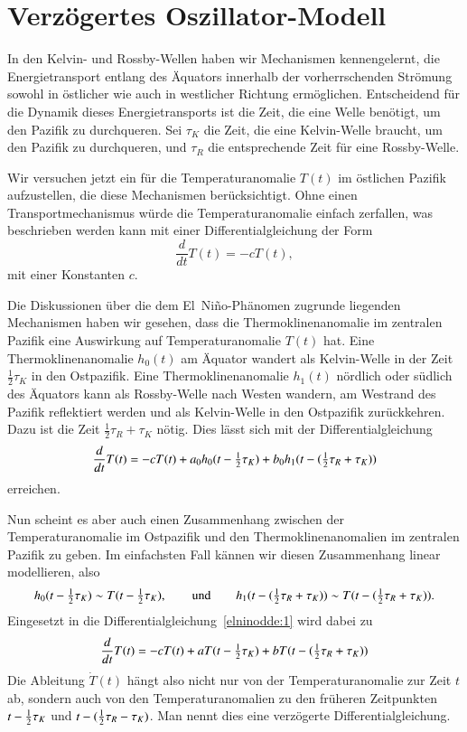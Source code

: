 %
%
%
\section{Verzögertes Oszillator-Modell\label{section:dde-nino}}
In den Kelvin- und Rossby-Wellen haben wir Mechanismen kennengelernt,
die Energietransport entlang des Äquators innerhalb der vorherrschenden
Strömung sowohl in östlicher wie auch in westlicher Richtung ermöglichen.
Entscheidend für die Dynamik dieses Energietransports ist die Zeit,
die eine Welle benötigt, um den Pazifik zu durchqueren.
Sei $\tau_K$ die Zeit, die eine Kelvin-Welle braucht, um den Pazifik
zu durchqueren, und $\tau_R$ die entsprechende Zeit für eine Rossby-Welle.

Wir versuchen jetzt ein für die Temperaturanomalie $T(t)$ im östlichen
Pazifik aufzustellen, die diese Mechanismen berücksichtigt.
Ohne einen Transportmechanismus würde die Temperaturanomalie einfach
zerfallen, was beschrieben werden kann mit einer Differentialgleichung
der Form
\[
\frac{d}{dt}T(t)
=
-cT(t),
\]
mit einer Konstanten $c$.

\def\halb{\bgroup\textstyle\frac12\egroup}

Die Diskussionen über die dem El~Niño-Phänomen zugrunde liegenden
Mechanismen haben wir gesehen, dass die Thermoklinenanomalie im
zentralen Pazifik eine Auswirkung auf Temperatur\-anomalie $T(t)$ hat.
Eine Thermoklinenanomalie $h_0(t)$ am Äquator wandert als
Kelvin-Welle in der Zeit $\frac12\tau_K$ in den Ostpazifik.
Eine Thermoklinenanomalie $h_1(t)$ nördlich oder südlich des Äquators
kann als Rossby-Welle nach Westen wandern, am Westrand des Pazifik
reflektiert werden und als Kelvin-Welle in den Ostpazifik zurückkehren.
Dazu ist die Zeit $\frac12\tau_R+\tau_K$ nötig.
Dies lässt sich mit der Differentialgleichung
\begin{equation}
\frac{d}{dt}T(t)
=
-cT(t) + a_0h_0(t-\halb\tau_K) + b_0h_1(t-(\halb\tau_R+\tau_K))
\label{elninodde:1}
\end{equation}
erreichen.

Nun scheint es aber auch einen Zusammenhang zwischen der Temperaturanomalie
im Ostpazifik und den Thermoklinenanomalien im zentralen Pazifik zu geben.
Im einfachsten Fall kännen wir diesen Zusammenhang linear modellieren,
also 
\[
h_0(t-\halb\tau_K)
\sim
T(t-\halb\tau_K),
\qquad
\text{und}
\qquad
h_1(t-(\halb\tau_R+\tau_K))
\sim
T(t-(\halb\tau_R+\tau_K)).
\]
Eingesetzt in die Differentialgleichung~\eqref{elninodde:1} wird dabei zu
\begin{equation}
\frac{d}{dt}T(t)
=
-cT(t) + aT(t-\halb\tau_K) + bT(t-(\halb\tau_R+\tau_K))
\label{elninodde:2}
\end{equation}
Die Ableitung $\dot T(t)$ hängt also nicht nur von der Temperaturanomalie
zur Zeit $t$ ab, sondern auch von den Temperaturanomalien zu den
früheren Zeitpunkten $t-\halb\tau_K$ und $t-(\halb\tau_R-\tau_K)$.
Man nennt dies eine verzögerte Differentialgleichung.

